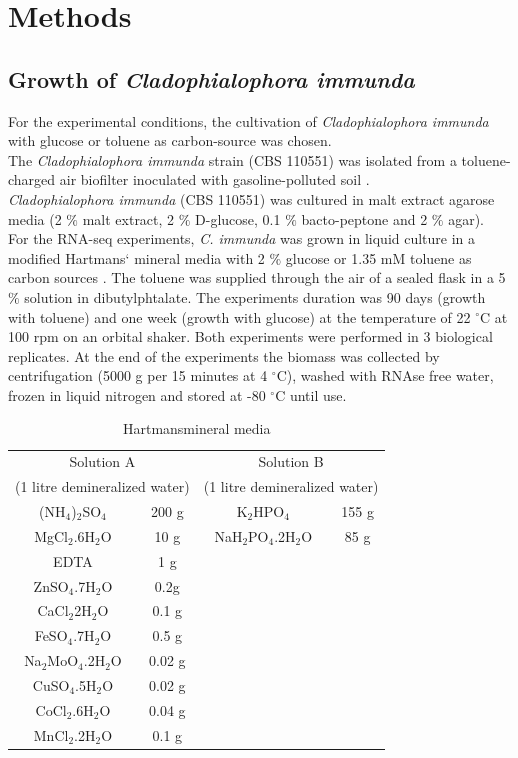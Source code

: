 \documentclass[12pt, a4paper]{report}
\begin{document}
\newpage
\setcounter{chapter}{2}\setcounter{section}{0}
\chapter*{Methods}
\section{Growth of \textit{Cladophialophora immunda}}
For the experimental conditions, the cultivation of \textit{Cladophialophora immunda} with glucose or toluene as carbon-source was chosen. \\
The \textit{Cladophialophora immunda} strain (CBS 110551) was isolated from a toluene-charged air biofilter inoculated with gasoline-polluted soil \cite{Prenafeta-Boldu2001}.  \\
\textit{Cladophialophora immunda} (CBS 110551) was cultured in malt extract agarose media (2 $\%$ malt extract, 2 $\%$ D-glucose, 0.1 $\%$ bacto-peptone and 2 $\%$ agar). \\
For the RNA-seq experiments, \textit{C. immunda} was grown in liquid culture in a modified Hartmans` mineral media with 2 $\%$ glucose or 1.35 mM toluene as carbon sources \cite{Hartmans1991}. The toluene was supplied through the air of a sealed flask in a 5 $\%$ solution in dibutylphtalate. The experiments duration was 90 days (growth with toluene) and one week (growth with glucose) at the temperature of 22 $^\circ$C at 100 rpm on an orbital shaker. Both experiments were performed in 3 biological replicates. At the end of the experiments the biomass was collected by centrifugation (5000 g per 15 minutes at 4 $^\circ$C), washed with RNAse free water, frozen in liquid nitrogen and stored at -80 $^\circ$C until use. \\

\begin{table}[h]
	\centering
	\begin{tabular}{c c | c c}
		\multicolumn{2}{c|}{Solution A} & \multicolumn{2}{c}{Solution B}  \\
		\multicolumn{2}{c|}{(1 litre demineralized water)}  & \multicolumn{2}{c}{(1 litre demineralized water)} \\
		\hline
		(NH$_4$)$_2$SO$_4$ & 200 g & K$_2$HPO$_4$ & 155 g\\
		MgCl$_2$.6H$_2$O & 10 g & NaH$_2$PO$_4$.2H$_2$O & 85 g \\
		EDTA & 1 g & &  \\
		ZnSO$_4$.7H$_2$O & 0.2g & & \\
		CaCl$_2$2H$_2$O & 0.1 g & & \\
		FeSO$_4$.7H$_2$O & 0.5 g & & \\
		Na$_2$MoO$_4$.2H$_2$O & 0.02 g & &\\                                
		CuSO$_4$.5H$_2$O & 0.02 g & & \\
		CoCl$_2$.6H$_2$O & 0.04 g & & \\
		MnCl$_2$.2H$_2$O & 0.1 g & & \\                          
	\end{tabular}
	\caption{Hartmans\textquotesingle mineral media}
\end{table}
\end{document}
